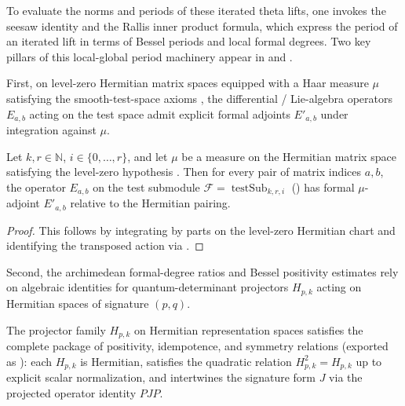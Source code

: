 To evaluate the norms and periods of these iterated theta lifts, one invokes
the seesaw identity and the Rallis inner product formula, which express the
period of an iterated lift in terms of Bessel periods and local formal degrees.
Two key pillars of this local-global period machinery appear in
 and .

First, on level-zero Hermitian matrix spaces equipped with a Haar measure
$\mu$ satisfying the smooth-test-space axioms ,
the differential / Lie-algebra operators $E_{a,b}$ acting on the test space
 admit explicit formal adjoints $E'_{a,b}$
under integration against $\mu$.

\begin{proposition}
\label{prop:ch02-herm-haar-adj}
Let $k, r \in \mathbb{N}$, $i \in \{0, \dots, r\}$, and let $\mu$ be a measure
on the Hermitian matrix space satisfying the level-zero hypothesis
.
Then for every pair of matrix indices $a, b$, the operator $E_{a,b}$ on the
test submodule $\mathcal{F} = \operatorname{testSub}_{k,r,i}$
() has formal $\mu$-adjoint $E'_{a,b}$
relative to the Hermitian pairing.
\end{proposition}

\begin{proof}
This follows by integrating by parts on the level-zero Hermitian chart and
identifying the transposed action via .
\end{proof}

Second, the archimedean formal-degree ratios and Bessel positivity estimates
rely on algebraic identities for quantum-determinant projectors $H_{p,k}$
acting on Hermitian spaces of signature $(p, q)$.

\begin{theorem}
\label{thm:ch02-bessel-pos-facts}
The projector family $H_{p,k}$ on Hermitian representation spaces satisfies the
complete package of positivity, idempotence, and symmetry relations
(exported as ): each $H_{p,k}$
is Hermitian, satisfies the quadratic relation $H_{p,k}^2 = H_{p,k}$ up to
explicit scalar normalization, and intertwines the signature form $J$ via the
projected operator identity $P J P$.
\end{theorem}

